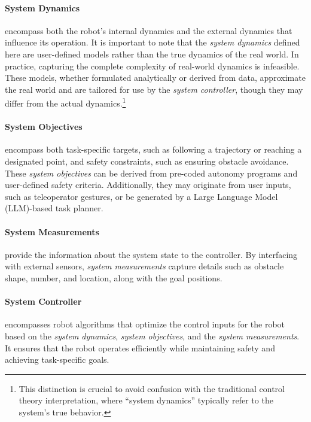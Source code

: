 \paragraph{\textbf{System Dynamics}} encompass both the robot's internal dynamics and the external dynamics that influence its operation. 
It is important to note that the \textit{system dynamics} defined here are user-defined models rather than the true dynamics of the real world. 
In practice, capturing the complete complexity of real-world dynamics is infeasible.
These models, whether formulated analytically or derived from data, approximate the real world and are tailored for use by the \textit{system controller}, though they may differ from the actual dynamics.\footnote{This distinction is crucial to avoid confusion with the traditional control theory interpretation, where ``system dynamics'' typically refer to the system's true behavior.}

\paragraph{\textbf{System Objectives}} encompass both task-specific targets, such as following a trajectory or reaching a designated point, and safety constraints, such as ensuring obstacle avoidance. 
These \textit{system objectives} can be derived from pre-coded autonomy programs and user-defined safety criteria. 
Additionally, they may originate from user inputs, such as teleoperator gestures, or be generated by a Large Language Model (LLM)-based task planner.

\paragraph{\textbf{System Measurements}} provide the information about the system state to the controller.
By interfacing with external sensors, \textit{system measurements} capture details such as obstacle shape, number, and location, along with the goal positions.

\paragraph{\textbf{System Controller}} encompasses robot algorithms that optimize the control inputs for the robot based on the \textit{system dynamics}, \textit{system objectives}, and the \textit{system measurements}. 
It ensures that the robot operates efficiently while maintaining safety and achieving task-specific goals.

